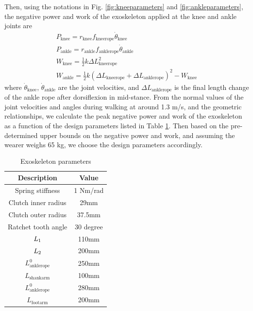 \documentclass[twocolumn,cleanfoot,10pt]{asme2ej}
\begin{document}
Then, using the notations in Fig. \ref{fig:kneeparameters} and \ref{fig:ankleparameters}, the negative power and work of the exoskeleton applied at the knee and ankle joints are
\begin{gather}
	P_\mathrm{knee} = r_\mathrm{knee}f_\mathrm{kneerope}\dot{\theta}_\mathrm{knee} \\
	P_\mathrm{ankle} = r_\mathrm{ankle}f_\mathrm{anklerope}\dot{\theta}_\mathrm{ankle} \\
	W_\mathrm{knee} = \frac{1}{2}k\Delta L_\mathrm{kneerope}^2 \\
	W_\mathrm{ankle} = \frac{1}{2}k(\Delta L_\mathrm{kneerope}+\Delta L_\mathrm{anklerope})^2 - W_\mathrm{knee}
\end{gather}
where $\dot{\theta}_\mathrm{knee}$, $\dot{\theta}_\mathrm{ankle}$ are the joint velocities, and $\Delta L_\mathrm{anklerope}$ is the final length change of the ankle rope after dorsiflexion in mid-stance.
From the normal values of the joint velocities and angles during walking at around 1.3 m/s, and the geometric relationships, we calculate the peak negative power and work of the exoskeleton as a function of the design parameters listed in Table \ref{tab:Exoskeleton parameters}.
Then based on the pre-determined upper bounds on the negative power and work, and assuming the wearer weighs 65 kg, we choose the design parameters accordingly.



\begin{table}[t]
	\caption{Exoskeleton parameters}
	\begin{center}
		\label{tab:Exoskeleton parameters}
		\begin{tabular}{c c}	
			\hline
			\textbf{Description } & \textbf{Value} \\
			\hline
			Spring stiffness & 1 Nm/rad\\
			Clutch inner radius & 29mm\\
			Clutch outer radius & 37.5mm\\
			Ratchet tooth angle & 30 degree\\
			$L_\textrm1$ & 110mm\\
			$L_\textrm2$ & 200mm\\
			$L_\textrm{anklerope}^0$ & 250mm\\
			$L_\textrm{shankarm}$  & 100mm\\
			$L_\textrm{anklerope}^0$ & 280mm\\
			$L_\textrm{footarm}$ & 200mm\\
			\hline
		\end{tabular}
	\end{center}
\end{table}
\end{document}
